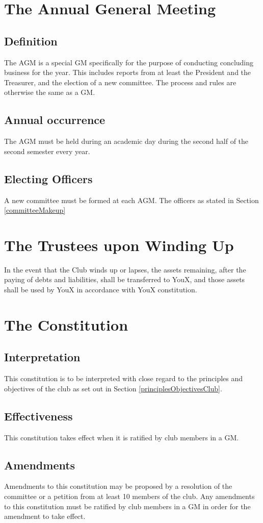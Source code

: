 \documentclass[11pt]{article}
\begin{document}
\section{The Annual General Meeting} \label{annualGeneralMeeting}
\subsection{Definition}
The AGM is a special GM specifically for the purpose of conducting concluding business for the year. This includes reports from at least the President and the Treasurer, and the election of a new committee. The process and rules are otherwise the same as a GM.
\subsection{Annual occurrence}
The AGM must be held during an academic day during the second half of the second semester every year.\subsection{Electing Officers}
A new committee must be formed at each AGM. The officers as stated in Section \ref{committeeMakeup}

\section{The Trustees upon Winding Up}
In the event that the Club winds up or lapses, the assets remaining, after the paying of debts and liabilities, shall be transferred to YouX, and those assets shall be used by YouX in accordance with YouX constitution.

\section{The Constitution}
\subsection{Interpretation}
This constitution is to be interpreted with close regard to the principles and objectives of the club as set out in Section \ref{principlesObjectivesClub}.
\subsection{Effectiveness}
This constitution takes effect when it is ratified by club members in a GM.
\subsection{Amendments}
Amendments to this constitution may be proposed by a resolution of the committee or a petition from at least 10 members of the club. Any amendments to this constitution must be ratified by club members in a GM in order for the amendment to take effect.
\end{document}
